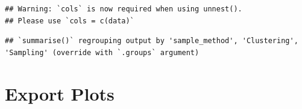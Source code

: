 \documentclass[
  english,
  man,floatsintext]{apa6}
\begin{document}
\begin{verbatim}
## Warning: `cols` is now required when using unnest().
## Please use `cols = c(data)`
\end{verbatim}

\begin{verbatim}
## `summarise()` regrouping output by 'sample_method', 'Clustering', 'Sampling' (override with `.groups` argument)
\end{verbatim}

\hypertarget{export-plots}{%
\section{Export Plots}\label{export-plots}}
\end{document}
